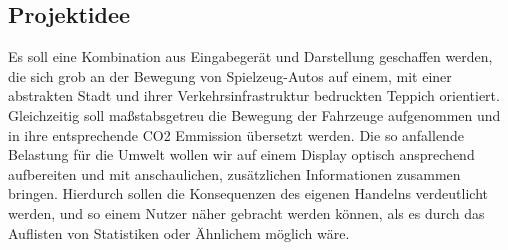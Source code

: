 \documentclass[.../Dokumentation.tex]{subfiles}
\begin{document}
\subsection{Projektidee}\label{sec-intr-idea}
Es soll eine Kombination aus Eingabegerät und Darstellung geschaffen werden, 
die sich grob an der Bewegung von Spielzeug-Autos auf einem, 
mit einer abstrakten Stadt und ihrer Verkehrsinfrastruktur bedruckten Teppich 
orientiert. Gleichzeitig soll maßstabsgetreu die Bewegung der Fahrzeuge 
aufgenommen und in ihre entsprechende CO2 Emmission übersetzt werden. 
Die so anfallende Belastung für die Umwelt wollen wir auf einem Display 
optisch ansprechend aufbereiten und mit anschaulichen, zusätzlichen 
Informationen zusammen bringen. 
Hierdurch sollen die Konsequenzen des eigenen Handelns verdeutlicht werden, 
und so einem Nutzer näher gebracht werden können, als es durch das 
Auflisten von Statistiken oder Ähnlichem möglich wäre.
\end{document}
